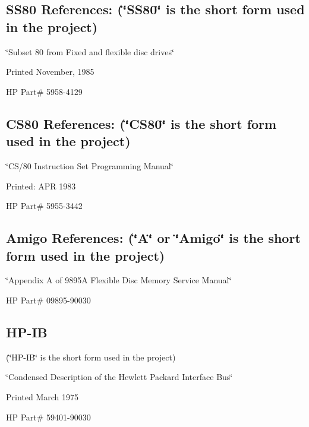 \subsection*{S\-S80 References\-: (\char`\"{}\-S\-S80\char`\"{} is the short form used in the project)}


\begin{DoxyItemize}
\item \char`\"{}\-Subset 80 from Fixed and flexible disc drives\char`\"{}
\item Printed November, 1985
\item H\-P Part\# 5958-\/4129
\end{DoxyItemize}

\subsection*{C\-S80 References\-: (\char`\"{}\-C\-S80\char`\"{} is the short form used in the project)}


\begin{DoxyItemize}
\item \char`\"{}\-C\-S/80 Instruction Set Programming Manual\char`\"{}
\item Printed\-: A\-P\-R 1983
\item H\-P Part\# 5955-\/3442
\end{DoxyItemize}

\subsection*{Amigo References\-: (\char`\"{}\-A\char`\"{} or \char`\"{}\-Amigo\char`\"{} is the short form used in the project)}


\begin{DoxyItemize}
\item \char`\"{}\-Appendix A of 9895\-A Flexible Disc Memory Service Manual\char`\"{}
\item H\-P Part\# 09895-\/90030
\end{DoxyItemize}

\subsection*{H\-P-\/\-I\-B}


\begin{DoxyItemize}
\item (\char`\"{}\-H\-P-\/\-I\-B\char`\"{} is the short form used in the project)
\item \char`\"{}\-Condensed Description of the Hewlett Packard Interface Bus\char`\"{}
\item Printed March 1975
\item H\-P Part\# 59401-\/90030
\end{DoxyItemize}

